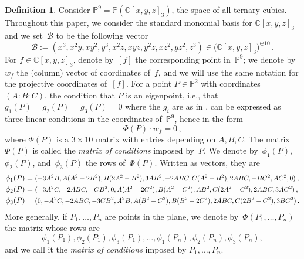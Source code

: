 \documentclass[a4paper, 11pt, reqno]{amsart}
\theoremstyle{plain}
\theoremstyle{definition}
\newtheorem{definition}[lemma]{Definition}
\newcommand{\C}{\mathbb{C}}
\newcommand{\p}{\mathbb{P}}
\newcommand\scalemath[2]{\scalebox{#1}{\mbox{\ensuremath{\displaystyle #2}}}}
\begin{document}
\begin{definition}
\label{definition:matrix_conditions}
Consider $\p^9 = \p(\C[x,y,z]_3)$, the space of all ternary cubics.
Throughout this paper, we consider the standard monomial basis for $\C[x,y,z]_3$ and we set~$\mathcal{B}$ to be the following vector
%
\begin{equation}
\label{eq:vector_basis}
  \mathcal{B} := (x^3, x^2 y, x y^2, y^3, x^2 z, x y z, y^2 z, x z^2, y z^2, z^3)
  \in \bigl( \C[x,y,z]_3 \bigr)^{\oplus 10} \,.
\end{equation}
For $f \in \C[x,y,z]_3$, denote by~$[f]$ the corresponding point in~$\p^9$; we denote by~$w_f$ the (column) vector of coordinates of~$f$, and we will use the same notation for the projective coordinates of~$[f]$.
For a point $P \in \p^2$ with coordinates $(A: B: C)$, the condition that $P$ is an eigenpoint, i.e., that $g_1(P) = g_2(P) = g_3(P) = 0$ where the $g_i$ are as in , can be expressed as three linear conditions in the coordinates of~$\p^9$,
hence
in the form
%
\[
  \Phi(P) \cdot w_f = 0 \,,
\]
%
where $\Phi(P)$ is a $3 \times 10$ matrix with entries depending on $A, B, C$.
The matrix $\Phi(P)$ is called the \emph{matrix of conditions} imposed by~$P$.
We denote by~$\phi_1(P)$, $\phi_2(P)$, and~$\phi_3(P)$ the rows of~$\Phi(P)$.
Written as vectors, they are
%
\begin{equation}
\label{eq:matrix_conditions_rows}
  \begin{aligned}
    \phi_1(P) &=
    \scalemath{0.9}{
    (-3A^2B, A(A^2 - 2B^2), B(2A^2 - B^2), 3AB^2,
     -2ABC, C(A^2 - B^2), 2 ABC,
     -B C^2, A C^2, 0)} \,, \\
    \phi_2(P) &= 
    \scalemath{0.9}{
    (-3A^2 C,
     -2ABC,
     -CB^2,
     0,
     A(A^2-2C^2),
     B(A^2 - C^2),
     AB^2,
     C(2A^2-C^2),
     2ABC,
     3AC^2)} \,,\\
    \phi_3(P) &=
    \scalemath{0.9}{
    (0,
     -A^2C,
     -2ABC,
     -3CB^2,
     A^2 B,
     A(B^2 - C^2),
     B(B^2-2C^2),
     2ABC,
     C(2B^2-C^2),
     3BC^2)} \,.
  \end{aligned}
\end{equation}
%
More generally, if $P_1, \dotsc, P_n$ are points in the plane, we denote by~$\Phi(P_1, \dotsc, P_n)$ the matrix whose rows are
%
\[
  \phi_1(P_1), \phi_2(P_1), \phi_3(P_1),
  \dotsc, 
  \phi_1(P_n), \phi_2(P_n), \phi_3(P_n),
\]
%
and we call it the
\emph{matrix of conditions} imposed by $P_1, \dotsc, P_n$.
\end{definition}
\end{document}
